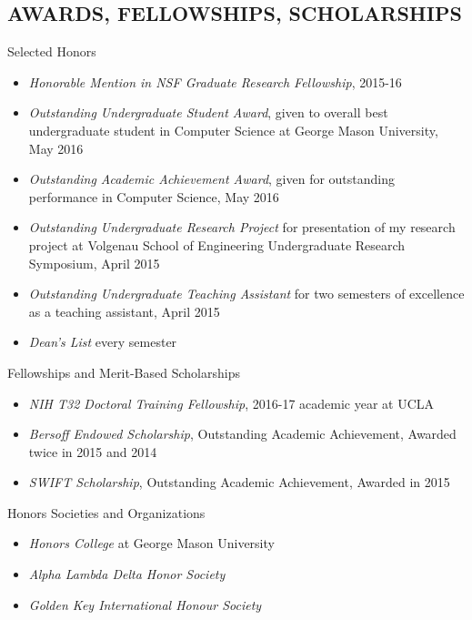 \documentclass[margin, 10pt]{res} %
\begin{document}
\begin{resume}

\section{AWARDS, FELLOWSHIPS, SCHOLARSHIPS} 

Selected Honors
\begin{itemize} \itemsep -2pt %
\item {\sl Honorable Mention in NSF Graduate Research Fellowship}, 2015-16
\item {\sl Outstanding Undergraduate Student Award}, given to overall best undergraduate student in Computer Science at George Mason University, May 2016
\item {\sl Outstanding Academic Achievement Award}, given for outstanding performance in Computer Science, May 2016
\item {\sl Outstanding Undergraduate Research Project} for presentation of my research project at Volgenau School of Engineering Undergraduate Research Symposium, April 2015
\item {\sl Outstanding Undergraduate Teaching Assistant} for two semesters of excellence as a teaching assistant, April 2015
\item {\sl Dean's List} every semester
\end{itemize}

Fellowships and Merit-Based Scholarships
\begin{itemize} \itemsep -2pt %
\item {\sl NIH T32 Doctoral Training Fellowship}, 2016-17 academic year at UCLA
\item {\sl Bersoff Endowed Scholarship}, Outstanding Academic Achievement, Awarded twice in 2015 and 2014
\item {\sl SWIFT Scholarship}, Outstanding Academic Achievement, Awarded in 2015
\end{itemize}

Honors Societies and Organizations
\begin{itemize} \itemsep -2pt %
\item {\sl Honors College} at George Mason University
\item {\sl Alpha Lambda Delta Honor Society}
\item {\sl Golden Key International Honour Society}
\end{itemize}


\end{resume}
\end{document}
